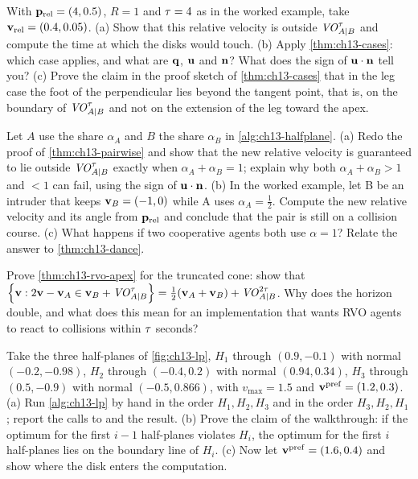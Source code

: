 \begin{exercise}[\difficulty{2}]
\label{exr:ch13-arc-case}
With $\mathbf{p}_{\mathrm{rel}} = (4, 0.5)$, $R = 1$ and $\tau = 4$ as in the
worked example, take $\mathbf{v}_{\mathrm{rel}} = (0.4, 0.05)$. (a) Show that this
relative velocity is outside $\mathit{VO}^{\tau}_{A|B}$ and compute the time at which
the disks would touch. (b) Apply \cref{thm:ch13-cases}: which case applies,
and what are $\mathbf{q}$, $\mathbf{u}$ and $\mathbf{n}$? What does the sign of
$\mathbf{u}\cdot\mathbf{n}$ tell you? (c) Prove the claim in the proof sketch of
\cref{thm:ch13-cases} that in the leg case the foot of the perpendicular
lies beyond the tangent point, that is, on the boundary of
$\mathit{VO}^{\tau}_{A|B}$ and not on the extension of the leg toward the apex.
\end{exercise}

\begin{exercise}[\difficulty{2}]
\label{exr:ch13-shares}
Let $A$ use the share $\alpha_A$ and $B$ the share $\alpha_B$ in
\cref{alg:ch13-halfplane}. (a) Redo the proof of \cref{thm:ch13-pairwise} and
show that the new relative velocity is guaranteed to lie outside
$\mathit{VO}^{\tau}_{A|B}$ exactly when $\alpha_A + \alpha_B = 1$; explain why both
$\alpha_A + \alpha_B > 1$ and $< 1$ can fail, using the sign of
$\mathbf{u}\cdot\mathbf{n}$. (b) In the worked example, let B be an intruder that
keeps $\mathbf{v}_B = (-1, 0)$ while A uses $\alpha_A = \tfrac12$. Compute the new
relative velocity and its angle from $\mathbf{p}_{\mathrm{rel}}$ and conclude that
the pair is still on a collision course. (c) What happens if two cooperative
agents both use $\alpha = 1$? Relate the answer to \cref{thm:ch13-dance}.
\end{exercise}

\begin{exercise}[\difficulty{2}]
\label{exr:ch13-rvo-truncated}
Prove \cref{thm:ch13-rvo-apex} for the truncated cone: show that
$\left\{ \mathbf{v} : 2\mathbf{v} - \mathbf{v}_A \in \mathbf{v}_B + \mathit{VO}^{\tau}_{A|B} \right\} =
\tfrac12(\mathbf{v}_A + \mathbf{v}_B) + \mathit{VO}^{2\tau}_{A|B}$. Why does the horizon double,
and what does this mean for an implementation that wants RVO agents to react
to collisions within $\tau$ seconds?
\end{exercise}

\begin{exercise}[\difficulty{2}]
\label{exr:ch13-lp-by-hand}
Take the three half-planes of \cref{fig:ch13-lp}, $H_1$ through
$(0.9, -0.1)$ with normal $(-0.2, -0.98)$, $H_2$ through $(-0.4, 0.2)$ with
normal $(0.94, 0.34)$, $H_3$ through $(0.5, -0.9)$ with normal
$(-0.5, 0.866)$, with $v_{\max} = 1.5$ and $\mathbf{v}^{\mathrm{pref}} = (1.2, 0.3)$.
(a) Run \cref{alg:ch13-lp} by hand in the order $H_1, H_2, H_3$ and in the
order $H_3, H_2, H_1$; report the calls to \OrcaLPLine and the result.
(b) Prove the claim of the walkthrough: if the optimum for the first $i-1$
half-planes violates $H_i$, the optimum for the first $i$ half-planes lies
on the boundary line of $H_i$. (c) Now let $\mathbf{v}^{\mathrm{pref}} = (1.6, 0.4)$
and show where the disk enters the computation.
\end{exercise}

